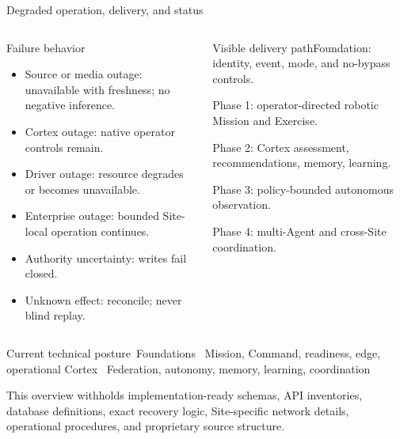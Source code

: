 \begin{frame}{Degraded operation, delivery, and status}
\begin{columns}[T]
\begin{block}{Failure behavior}\small\begin{itemize}\item Source or media outage: unavailable with freshness; no negative inference.\item Cortex outage: native operator controls remain.\item Driver outage: resource degrades or becomes unavailable.\item Enterprise outage: bounded Site-local operation continues.\item Authority uncertainty: writes fail closed.\item Unknown effect: reconcile; never blind replay.\end{itemize}\end{block}
\begin{block}{Visible delivery path}\small Foundation: identity, event, mode, and no-bypass controls.\par\vspace{1mm}Phase 1: operator-directed robotic Mission and Exercise.\par\vspace{1mm}Phase 2: Cortex assessment, recommendations, memory, learning.\par\vspace{1mm}Phase 3: policy-bounded autonomous observation.\par\vspace{1mm}Phase 4: multi-Agent and cross-Site coordination.\end{block}
\end{columns}
\vspace{2mm}
\begin{block}{Current technical posture}\centering \tagcurrent\ Foundations \quad \tagdev\ Mission, Command, readiness, edge, operational Cortex \quad \tagplanned\ Federation, autonomy, memory, learning, coordination\end{block}
\vspace{2mm}
{\color{muted}\scriptsize This overview withholds implementation-ready schemas, API inventories, database definitions, exact recovery logic, Site-specific network details, operational procedures, and proprietary source structure.}
\end{frame}
